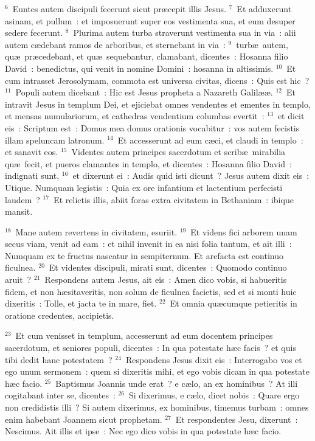 ${}^{6}$~Euntes autem discipuli fecerunt sicut pr\ae cepit illis Jesus.
${}^{7}$~Et adduxerunt asinam, et pullum~: et imposuerunt super eos vestimenta sua, et eum desuper sedere fecerunt.
${}^{8}$~Plurima autem turba straverunt vestimenta sua in via~: alii autem c\ae debant ramos de arboribus, et sternebant in via~:
${}^{9}$~turb\ae\ autem, qu\ae\ pr\ae cedebant, et qu\ae\ sequebantur, clamabant, dicentes~: Hosanna filio David~: benedictus, qui venit in nomine Domini~: hosanna in altissimis.
${}^{10}$~Et cum intrasset Jerosolymam, commota est universa civitas, dicens~: Quis est hic~?
${}^{11}$~Populi autem dicebant~: Hic est Jesus propheta a Nazareth Galil\ae \ae .
${}^{12}$~Et intravit Jesus in templum Dei, et ejiciebat omnes vendentes et ementes in templo, et mensas numulariorum, et cathedras vendentium columbas evertit~:
${}^{13}$~et dicit eis~: Scriptum est~: Domus mea domus orationis vocabitur~: vos autem fecistis illam speluncam latronum.
${}^{14}$~Et accesserunt ad eum c\ae ci, et claudi in templo~: et sanavit eos.
${}^{15}$~Videntes autem principes sacerdotum et scrib\ae\ mirabilia qu\ae\ fecit, et pueros clamantes in templo, et dicentes~: Hosanna filio David~: indignati sunt,
${}^{16}$~et dixerunt ei~: Audis quid isti dicunt~? Jesus autem dixit eis~: Utique. Numquam legistis~: Quia ex ore infantium et lactentium perfecisti laudem~?
${}^{17}$~Et relictis illis, abiit foras extra civitatem in Bethaniam~: ibique mansit.


${}^{18}$~Mane autem revertens in civitatem, esuriit.
${}^{19}$~Et videns fici arborem unam secus viam, venit ad eam~: et nihil invenit in ea nisi folia tantum, et ait illi~: Numquam ex te fructus nascatur in sempiternum. Et arefacta est continuo ficulnea.
${}^{20}$~Et videntes discipuli, mirati sunt, dicentes~: Quomodo continuo aruit~?
${}^{21}$~Respondens autem Jesus, ait eis~: Amen dico vobis, si habueritis fidem, et non h\ae sitaveritis, non solum de ficulnea facietis, sed et si monti huic dixeritis~: Tolle, et jacta te in mare, fiet.
${}^{22}$~Et omnia qu\ae cumque petieritis in oratione credentes, accipietis.


${}^{23}$~Et cum venisset in templum, accesserunt ad eum docentem principes sacerdotum, et seniores populi, dicentes~: In qua potestate h\ae c facis~? et quis tibi dedit hanc potestatem~?
${}^{24}$~Respondens Jesus dixit eis~: Interrogabo vos et ego unum sermonem~: quem si dixeritis mihi, et ego vobis dicam in qua potestate h\ae c facio.
${}^{25}$~Baptismus Joannis unde erat~? e c\ae lo, an ex hominibus~? At illi cogitabant inter se, dicentes~:
${}^{26}$~Si dixerimus, e c\ae lo, dicet nobis~: Quare ergo non credidistis illi~? Si autem dixerimus, ex hominibus, timemus turbam~: omnes enim habebant Joannem sicut prophetam.
${}^{27}$~Et respondentes Jesu, dixerunt~: Nescimus. Ait illis et ipse~: Nec ego dico vobis in qua potestate h\ae c facio.


